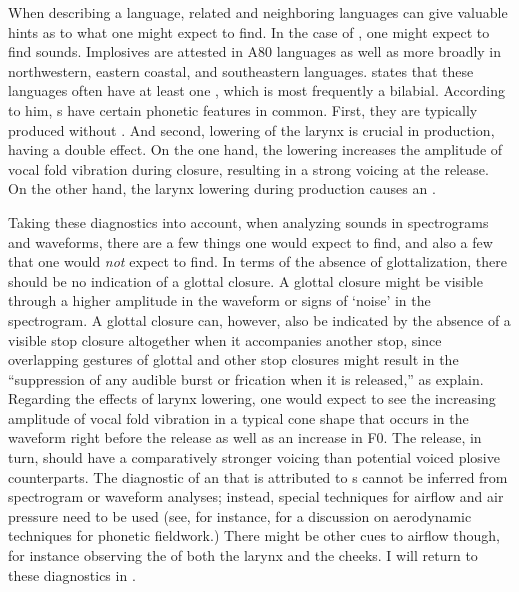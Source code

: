 \documentclass[output=paper]{LSP/langsci}
\begin{document}
When describing a language, related and neighboring languages can give valuable hints as to what one might expect to find. In the case of , one might expect to find  sounds.
Implosives are attested in  A80 languages as well as more broadly in northwestern, eastern coastal, and southeastern  languages. \citet[28]{Maddieson2003} states that these languages often have at least one , which is most frequently a bilabial. According to him,  s have certain phonetic features in common.  First, they are typically produced without . And second, lowering of the larynx is crucial in   production, having a double effect. On the one hand, the lowering increases the amplitude of vocal fold vibration during closure, resulting in a strong voicing at the release. On the other hand, the larynx lowering during production causes an .

Taking these diagnostics into account, when analyzing  sounds in spectrograms and waveforms, there are a few things one would expect to find, and also a few that one would {\it not} expect to find. In terms of the absence of glottalization, there should be no indication of a glottal closure. A glottal closure might be visible through a higher amplitude in the waveform  or signs of `noise' in the spectrogram. A glottal closure can, however, also be indicated by the absence of a visible stop closure  altogether when it accompanies another stop, since overlapping gestures of glottal and other stop closures might result in the ``suppression of  any audible burst or frication when it is released,'' as \citet[73]{Ladefoged1996} explain. 
Regarding the effects of larynx lowering, one would expect to see the increasing amplitude of vocal fold vibration in a typical cone shape that occurs in the waveform right before the release as well as an increase in F0. The release, in turn, should have a comparatively stronger voicing than potential voiced plosive counterparts.
The diagnostic of an  that is attributed to  s cannot be inferred from spectrogram or waveform analyses; instead, special techniques for airflow and air pressure need to be used (see, for instance, \citealt{Demolin2011} for a discussion on aerodynamic techniques for phonetic fieldwork.) There might be other cues to airflow though, for instance observing the  of both the larynx and the cheeks. I will return to these diagnostics in .
\end{document}
